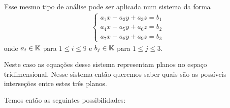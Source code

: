 Esse mesmo tipo de análise pode ser aplicada num sistema da forma
\begin{align}
    \begin{cases}\label{sistema_linear_3x3}
        a_1x + a_2y + a_3z = b_1\\
        a_4x + a_5y + a_6z = b_2\\
        a_7x + a_8y + a_9z = b_3
    \end{cases}
\end{align}
onde $a_i \in \mathbb{K}$ para $1 \le i \le 9$ e $b_j \in \mathbb{K}$ para $1 \le j \le 3$.

Neste caso as equações desse sistema representam planos no espaço tridimensional. Nesse sistema então queremos saber quais são as possíveis interseções entre estes três planos.

Temos então as seguintes possibilidades:


